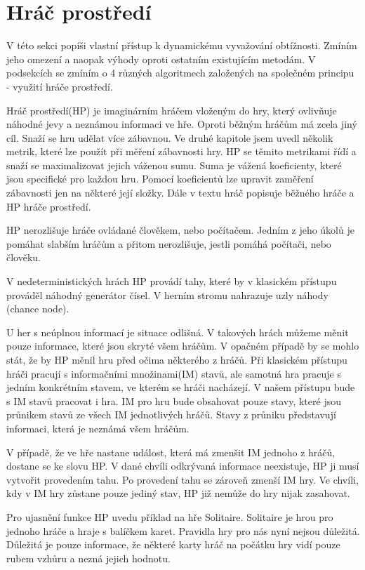 \section{Hráč prostředí}

V této sekci popíši vlastní přístup k dynamickému vyvažování obtížnosti. Zmíním jeho omezení a naopak výhody oproti ostatním existujícím metodám. V podsekcích se zmíním o 4 různých algoritmech založených na společném principu - využití hráče prostředí.

Hráč prostředí(HP) je imaginárním hráčem vloženým do hry, který ovlivňuje náhodné jevy a neznámou informaci ve hře. Oproti běžným hráčům má zcela jiný cíl. Snaží se hru udělat více zábavnou. Ve druhé kapitole jsem uvedl několik metrik, které lze použít při měření zábavnosti hry. HP se těmito metrikami řídí a snaží se maximalizovat jejich váženou sumu. Suma je vážená koeficienty, které jsou specifické pro každou hru. Pomocí koeficientů lze upravit zaměření zábavnosti jen na některé její složky. Dále v textu hráč popisuje běžného hráče a HP hráče prostředí.

HP nerozlišuje hráče ovládané člověkem, nebo počítačem. Jedním z jeho úkolů je pomáhat slabším hráčům a přitom nerozlišuje, jestli pomáhá počítači, nebo člověku.

V nedeterministických hrách HP provádí tahy, které by v klasickém přístupu prováděl náhodný generátor čísel. V herním stromu nahrazuje uzly náhody (chance node). 

U her s neúplnou informací je situace odlišná. V takových hrách můžeme měnit pouze informace, které jsou skryté všem hráčům. V opačném případě by se mohlo stát, že by HP měnil hru před očima některého z hráčů. Při klasickém přístupu hráči pracují s informačními množinami(IM) stavů, ale samotná hra pracuje s jedním konkrétním stavem, ve kterém se hráči nacházejí. V našem přístupu bude s IM stavů pracovat i hra. IM pro hru bude obsahovat pouze stavy, které jsou průnikem stavů ze všech IM jednotlivých hráčů. Stavy z průniku představují informaci, která je neznámá všem hráčům. 

V případě, že ve hře nastane událost, která má zmenšit IM jednoho z hráčů, dostane se ke slovu HP. V dané chvíli odkrývaná informace neexistuje, HP ji musí vytvořit provedením tahu. Po provedení tahu se zároveň zmenší IM hry. Ve chvíli, kdy v IM hry zůstane pouze jediný stav, HP již nemůže do hry nijak zasahovat.

Pro ujasnění funkce HP uvedu příklad na hře Solitaire. Solitaire je hrou pro jednoho hráče a hraje s balíčkem karet. Pravidla hry pro nás nyní nejsou důležitá. Důležitá je pouze informace, že některé karty hráč na počátku hry vidí pouze rubem vzhůru a nezná jejich hodnotu. 

